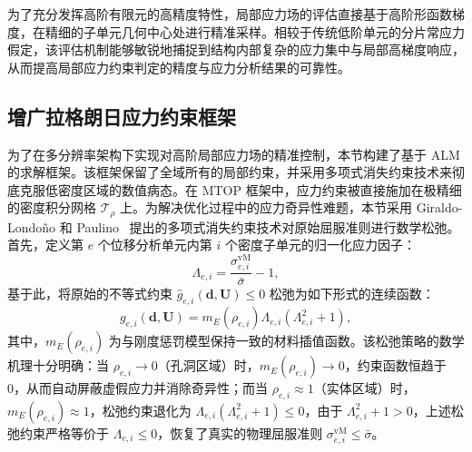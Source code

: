为了充分发挥高阶有限元的高精度特性，局部应力场的评估直接基于高阶形函数梯度，在精细的子单元几何中心处进行精准采样。相较于传统低阶单元的分片常应力假定，该评估机制能够敏锐地捕捉到结构内部复杂的应力集中与局部高梯度响应，从而提高局部应力约束判定的精度与应力分析结果的可靠性。


\subsection{增广拉格朗日应力约束框架}
\label{subsec:alm_stress_constraint}

为了在多分辨率架构下实现对高阶局部应力场的精准控制，本节构建了基于 ALM 的求解框架。该框架保留了全域所有的局部约束，并采用多项式消失约束技术来彻底克服低密度区域的数值病态。在 MTOP 框架中，应力约束被直接施加在极精细的密度积分网格 $\mathcal{T}_\rho$ 上。为解决优化过程中的应力奇异性难题，本节采用 Giraldo-Londoño 和 Paulino~\cite{giraldo-londonoUnifiedApproachTopology2020} 提出的多项式消失约束技术对原始屈服准则进行数学松弛。首先，定义第 $e$ 个位移分析单元内第 $i$ 个密度子单元的归一化应力因子：
\[
\Lambda_{e,i} = \frac{\sigma_{e,i}^{\text{vM}}}{\bar{\sigma}} - 1,
\]
基于此，将原始的不等式约束  $\hat{g}_{e,i}(\boldsymbol{d}, \boldsymbol{U}) \le 0$ 松弛为如下形式的连续函数：
\begin{equation} \label{eq:ch4_poly_restrict_func}
	g_{e,i}(\boldsymbol{d}, \boldsymbol{U}) = m_E(\rho_{e,i})\Lambda_{e,i}(\Lambda_{e,i}^2 + 1),
\end{equation}
其中，$m_E(\rho_{e,i})$ 为与刚度惩罚模型保持一致的材料插值函数。该松弛策略的数学机理十分明确：当 $\rho_{e,i} \to 0$（孔洞区域）时，$m_E(\rho_{e,i}) \to 0$，约束函数恒趋于 0，从而自动屏蔽虚假应力并消除奇异性；而当 $\rho_{e,i} \approx 1$（实体区域）时，$m_E(\rho_{e,i}) \approx 1$，松弛约束退化为 $\Lambda_{e,i}(\Lambda_{e,i}^2 + 1) \le 0$，由于 $\Lambda_{e,i}^2 + 1 > 0$，上述松弛约束严格等价于 $\Lambda_{e,i} \le 0$，恢复了真实的物理屈服准则 $\sigma_{e,i}^{\text{vM}} \le \bar{\sigma}$。

